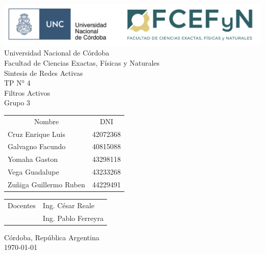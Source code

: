 \begin{titlepage}
    

\thispagestyle{empty}


\begin{center}
    \includegraphics[width=15cm]{figuras/color_UNC-FCEFyN.png}
    \\[1cm]
    \vspace{5pt}
   \vspace{5pt}
    \LARGE Universidad Nacional de Córdoba\\[0.5cm] 
    \large Facultad de Ciencias Exactas, Físicas y Naturales \\[0.5cm] 
    \large Sintesis de Redes Activas
    \\[0.2cm]
    \large TP N° 4
    \\[0.2cm]
    \large Filtros Activos
    \\[0.2cm]
    \large Grupo 3
    \\[0.2cm]
    \vspace{60pt}
    \begin{table}[!h]
    \centering
    \begin{tabular}{ll}
    \multicolumn{1}{c}{Nombre} & \multicolumn{1}{c}{DNI} \\
    Cruz Enrique Luis & 42072368 \\
    Galvagno Facundo& 40815088 \\
    Yomaha Gaston & 43298118 \\
    Vega Guadalupe & 43233268 \\
    Zuñiga Guillermo Ruben & 44229491\\
    
    \end{tabular}
    \end{table}
    \vspace{20pt}
    \begin{table}[!h]
    \centering
    \begin{tabular}{ll}
    \multicolumn{1}{c}{Docentes} & Ing. César Reale \\
     & Ing. Pablo Ferreyra
    \end{tabular}
    \end{table}
    \vfill
    Córdoba, República Argentina\\
    \today
\end{center}

\end{titlepage}